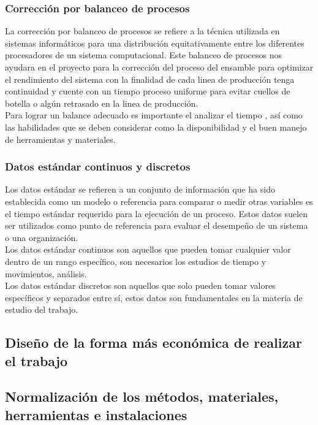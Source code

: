     \subsubsection{Corrección por balanceo de procesos}
    La corrección por balanceo de procesos se refiere a la técnica utilizada en sistemas informáticos para una distribución equitativamente entre los diferentes procesadores de un sistema computacional. 
    Este balanceo de procesos nos ayudara en el proyecto para la corrección  del proceso del ensamble para optimizar el rendimiento del sistema con la finalidad de cada linea de producción tenga continuidad y cuente con un tiempo proceso uniforme para evitar cuellos de botella o algún retrasado en la linea de producción.\\
    Para lograr un balance adecuado es importante el analizar el tiempo , así como las habilidades que se deben considerar como la disponibilidad y el buen manejo de herramientas y materiales.
    \subsubsection{Datos estándar continuos y discretos}
    Los datos estándar se refieren a un conjunto de información que ha sido establecida como un modelo o referencia para comparar o medir otras variables es el tiempo estándar requerido para la ejecución de un proceso. Estos datos suelen ser utilizados como punto de referencia para evaluar el desempeño de un sistema o una organización.\\
    Los datos estándar continuos son aquellos que pueden tomar cualquier valor dentro de un rango específico, son necesarios los estudios de tiempo y movimientos, análisis.\\
    Los datos estándar discretos son aquellos que solo pueden tomar valores específicos y separados entre sí, estos datos son fundamentales en la materia de estudio del trabajo.\\
    \subsection{Diseño de la forma más económica de realizar el trabajo}
    
    \subsection{Normalización de los métodos, materiales, herramientas e instalaciones}
    
